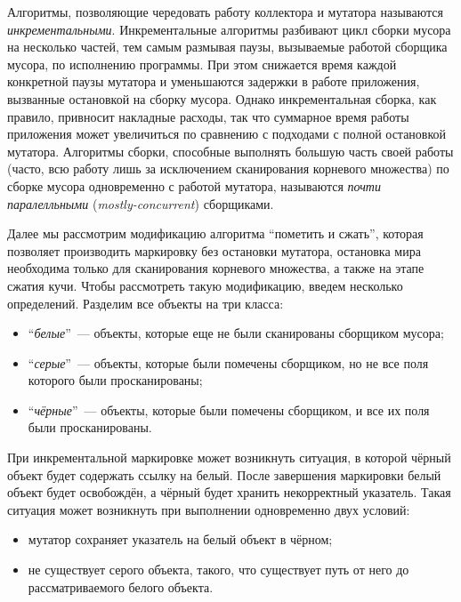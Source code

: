Алгоритмы, позволяющие чередовать работу коллектора и мутатора называются 
\emph{инкрементальными}. 
Инкрементальные алгоритмы разбивают цикл сборки мусора на несколько частей, 
тем самым размывая паузы, вызываемые работой сборщика мусора, по исполнению программы.
При этом снижается время каждой конкретной паузы мутатора 
и уменьшаются задержки в работе приложения, вызванные остановкой на сборку мусора. 
Однако инкрементальная сборка, как правило, привносит накладные расходы, 
так что суммарное время работы приложения может увеличиться по сравнению 
с подходами с полной остановкой мутатора. 
Алгоритмы сборки, способные выполнять большую часть своей работы (часто, всю работу 
лишь за исключением сканирования корневого множества) по сборке мусора одновременно 
с работой мутатора, называются \emph{почти паралелльными} (\emph{mostly-concurrent}) 
сборщиками.  

Далее мы рассмотрим модификацию алгоритма ``пометить и сжать'', которая позволяет 
производить маркировку без остановки мутатора, остановка мира необходима только для 
сканирования корневого множества, а также на этапе сжатия кучи. 
Чтобы рассмотреть такую модификацию, введем несколько определений. 
Разделим все объекты на три класса: 

\begin{itemize}
\item 
	``\emph{белые}''~--- объекты, которые еще не были сканированы сборщиком мусора;
\item 
	``\emph{серые}''~--- объекты, которые были помечены сборщиком, но не все поля 
	которого были просканированы;
\item 
	``\emph{чёрные}''~--- объекты, которые были помечены сборщиком, и все их поля 
	были просканированы.
\end{itemize}

При инкрементальной маркировке может возникнуть ситуация, в которой чёрный объект 
будет содержать ссылку на белый. 
После завершения маркировки белый объект будет освобождён, а чёрный будет хранить 
некорректный указатель. 
Такая ситуация может возникнуть при выполнении одновременно двух условий:
\begin{itemize}
\item 
	мутатор сохраняет указатель на белый объект в чёрном;
\item 
	не существует серого объекта, такого, что существует путь от него до рассматриваемого 
	белого объекта.
\end{itemize}

